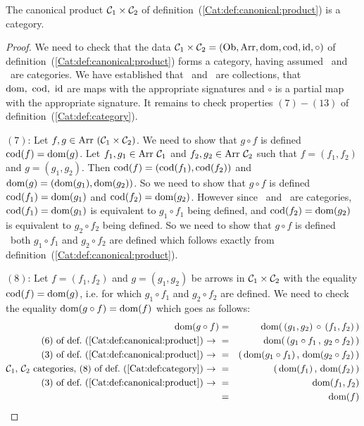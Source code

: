 \begin{prop}\label{Cat:prop:canonical:product:is:category}
    The canonical product $\mbox{${\cal C}_{1}$}\times\mbox{${\cal C}_{2}$}$ of 
    definition~(\ref{Cat:def:canonical:product}) is a category.
\end{prop}
\begin{proof}
    We need to check that the data $\mbox{${\cal C}_{1}$}\times\mbox{${\cal C}_{2}$}=(\mbox{\rm Ob}, \mbox{\rm Arr}, \mbox{\rm dom}, 
    \mbox{\rm cod}, \mbox{\rm id}, \circ)$ of definition~(\ref{Cat:def:canonical:product})
    forms a category, having assumed \Cone\ and \Ctwo\ are categories.
    We have established that \ob\ and \arr\ are collections, that 
    $\mbox{\rm dom},\ \mbox{\rm cod},\ \mbox{\rm id}$ are maps with the appropriate signatures and
    $\circ$ is a partial map with the appropriate signature.
    It remains to check properties $(7)-(13)$ of 
    definition~(\ref{Cat:def:category}).

    $(7)$: Let $f,g\in\mbox{\rm Arr}\ (\mbox{${\cal C}_{1}$}\times\mbox{${\cal C}_{2}$})$. We need to show that $g\circ f$
    is defined \ifand\ $\mbox{\rm cod}(f)=\mbox{\rm dom}(g)$. Let $f_{1},g_{1}\in\mbox{\rm Arr}\ \mbox{${\cal C}_{1}$}$ and
    $f_{2},g_{2}\in\mbox{\rm Arr}\ \mbox{${\cal C}_{2}$}$ such that $f=(f_{1},f_{2})$ and $g=(g_{1},g_{2})$.
    Then $\mbox{\rm cod}(f)=(\mbox{\rm cod}(f_{1}),\mbox{\rm cod}(f_{2}))$ and 
    $\mbox{\rm dom}(g)=(\mbox{\rm dom}(g_{1}),\mbox{\rm dom}(g_{2}))$. So we need to show that $g\circ f$ is
    defined \ifand\ $\mbox{\rm cod}(f_{1})=\mbox{\rm dom}(g_{1})$ and $\mbox{\rm cod}(f_{2})=\mbox{\rm dom}(g_{2})$.
    However since \Cone\ and \Ctwo\ are categories, $\mbox{\rm cod}(f_{1})=\mbox{\rm dom}(g_{1})$
    is equivalent to $g_{1}\circ f_{1}$ being defined, and 
    $\mbox{\rm cod}(f_{2})=\mbox{\rm dom}(g_{2})$ is equivalent to $g_{2}\circ f_{2}$ being defined.
    So we need to show that $g\circ f$ is defined \ifand\ both $g_{1}\circ f_{1}$
    and $g_{2}\circ f_{2}$ are defined which follows exactly from 
    definition~(\ref{Cat:def:canonical:product}).

    $(8)$: Let $f=(f_{1},f_{2})$ and $g=(g_{1},g_{2})$ be arrows in $\mbox{${\cal C}_{1}$}\times
    \mbox{${\cal C}_{2}$}$ with the equality $\mbox{\rm cod}(f)=\mbox{\rm dom}(g)$, i.e. for which $g_{1}\circ f_{1}$
    and $g_{2}\circ f_{2}$ are defined. We need to check the equality
    $\mbox{\rm dom}(g\circ f) = \mbox{\rm dom}(f)$ which goes as follows:
        \begin{eqnarray*}\dom(g\circ f)
            &=&\dom(\,(g_{1},g_{2})\,\circ\,(f_{1},f_{2})\,)\\
            \mbox{$(6)$ of def.~(\ref{Cat:def:canonical:product})\ $\to$\ }
            &=&\dom(\,(g_{1}\circ f_{1}\,,\,g_{2}\circ f_{2})\,)\\
            \mbox{$(3)$ of def.~(\ref{Cat:def:canonical:product})\ $\to$\ }
            &=&(\,\dom(g_{1}\circ f_{1})\,,\,\dom(g_{2}\circ f_{2})\,)\\
            \mbox{\Cone,\ \Ctwo\ categories, 
                $(8)$ of def.~(\ref{Cat:def:category})\ $\to$\ }
            &=&(\,\dom(f_{1})\,,\,\dom(f_{2})\,)\\
            \mbox{$(3)$ of def.~(\ref{Cat:def:canonical:product})\ $\to$\ }
            &=&\dom(f_{1},f_{2})\\
            &=&\dom(f)
        \end{eqnarray*}


\end{proof}
